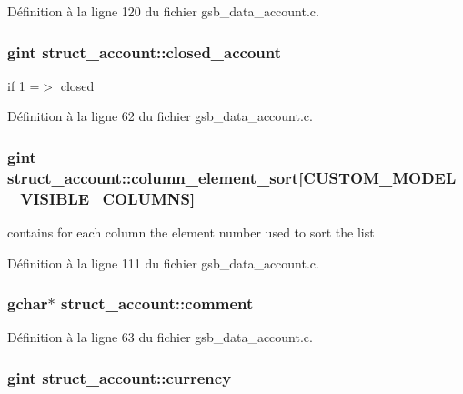 Définition à la ligne 120 du fichier gsb\_\-data\_\-account.c.

\subsubsection[{closed\_\-account}]{\setlength{\rightskip}{0pt plus 5cm}gint {\bf struct\_\-account::closed\_\-account}}\label{structstruct__account_a5c542df72674d4ec81ef0a235be225df}
if 1 =$>$ closed 

Définition à la ligne 62 du fichier gsb\_\-data\_\-account.c.

\subsubsection[{column\_\-element\_\-sort}]{\setlength{\rightskip}{0pt plus 5cm}gint {\bf struct\_\-account::column\_\-element\_\-sort}[CUSTOM\_\-MODEL\_\-VISIBLE\_\-COLUMNS]}\label{structstruct__account_ac50c18c29546bd28c7a6a5a35fa47d90}
contains for each column the element number used to sort the list 

Définition à la ligne 111 du fichier gsb\_\-data\_\-account.c.

\subsubsection[{comment}]{\setlength{\rightskip}{0pt plus 5cm}gchar$\ast$ {\bf struct\_\-account::comment}}\label{structstruct__account_ac3f8faf4a457e2b2d2fd3ab4a1cd1e99}


Définition à la ligne 63 du fichier gsb\_\-data\_\-account.c.

\subsubsection[{currency}]{\setlength{\rightskip}{0pt plus 5cm}gint {\bf struct\_\-account::currency}}\label{structstruct__account_a8097a13d2db85ea1810d437a5bcdcabb}


